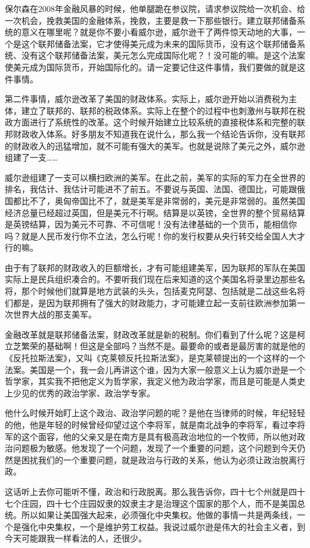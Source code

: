 \documentclass[UTF8, 12pt, a4paper]{ctexrep}
\begin{document}
保尔森在2008年金融风暴的时候，他单腿跪在参议院，请求参议院给一次机会、给一次机会，挽救美国的金融体系，挽救，主要是救一下那些银行。建立联邦储备系统的意义在哪里呢？就是你不要小看威尔逊，威尔逊干了两件惊天动地的大事，一个是这个联邦储备法案，它才使得美元成为未来的国际货币，没有这个联邦储备系统、没有这个联邦储备法案，美元怎么完成国际化呢？！没可能的嘛。是这个法案使美元成为国际货币，开始国际化的。请一定要记住这件事情，我们要做的就是这件事情。

第二件事情，威尔逊改革了美国的财政体系。实际上，威尔逊开始以消费税为主体，建立了联邦的、联邦的税政体系。实际上在整个的过程中也刺激州与联邦在税政方面进行了系统性的改革。这个时候开始建立比较系统的直接税体系和完整的联邦财政收入体系。好多朋友不知道我在说什么，那么我一个结论告诉你，没有联邦的财政收入的迅猛增加，就不可能有强大的美军。也就是说除了美元之外，威尔逊组建了一支……

威尔逊组建了一支可以横扫欧洲的美军。在此之前，美军的实际的军力在全世界的排名，我估计、我估计可能进不了前五。不要说与英国、法国、德国比，可能跟俄国都比不了，奥匈帝国比不了，就是美军是非常弱的，美元是非常弱的。虽然美国经济总量已经超过英国，但是美元不行啊。结算是以英镑，全世界的整个贸易结算是英镑结算，因为美元不可靠、不可信呢！没有法律基础的一个货币，能相信你吗？就是人民币发行你不立法，怎么行呢！你的发行权要从央行转交给全国人大才行的嘛。

由于有了联邦的财政收入的巨额增长，才有可能组建美军，因为联邦的军队在美国实际上是民兵组织凑合的。不要听我们现在后来知道的这个美国名将录里边那些名将，那个时候他们就算是地方武装的头头，包括麦克阿瑟、包括就是二战这些名将们都是，是因为联邦拥有了强大的财政能力，才可能建立起一支前往欧洲参加第一次世界大战的那支美军。

金融改革就是联邦储备法案，财政改革就是新的税制。你们看到了什么呢？这是柯立芝繁荣的基础啊！但这是全部吗？当然不是。最要命的或者是最厉害的就是他的《反托拉斯法案》，又叫《克莱顿反托拉斯法案》，是克莱顿提出的一个这样的一个法案。美国是一个，我一会儿再讲这个谁，因为大家一般意义上认为威尔逊是一个哲学家，其实我不把他定义为哲学家，我定义他为政治学家，而且是可能是人类史上少见的优秀的政治学家、政治学专家。

他什么时候开始盯上这个政治、政治学问题的呢？是他在当律师的时候，年纪轻轻的他，他是年轻的时候曾经仰望过这个李将军，就是南北战争的李将军，看过李将军的这个面容，他的父亲又是在南方是具有极高政治地位的一个牧师，所以他对政治问题极为敏感。他发现了一个问题，发现了一个重要的问题，这个问题到今天仍然是困扰我们的一个重要问题，就是政治与行政的关系，他认为必须让政治脱离行政。

这话听上去你可能听不懂，政治和行政脱离。那么我告诉你，四十七个州就是四十七个庄园，四十七个庄园奴隶的奴隶主才是治理这个国家的那个人，而不是美国总统。所以如果让美国强大起来，必须强化中央集权。他做的事情一共是两条线，一个是强化中央集权，一个是维护劳工权益。我说过威尔逊是伟大的社会主义者，到今天可能跟我一样看法的人，还很少。
\end{document}

